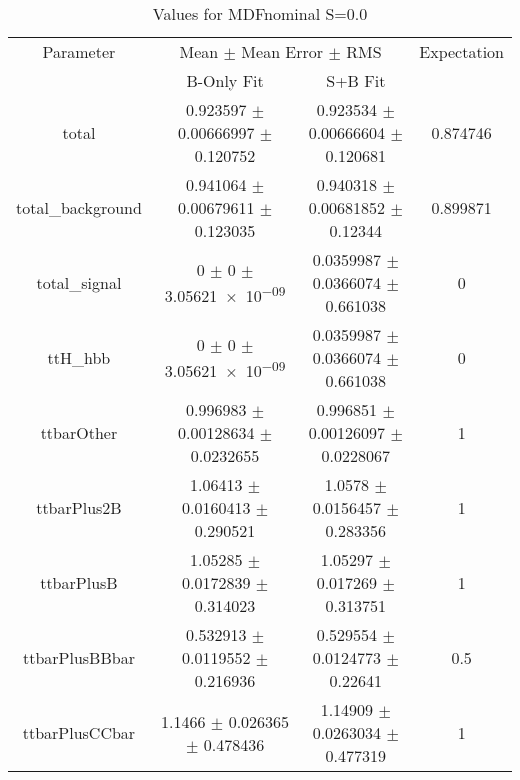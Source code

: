 \begin{table}
\centering
\caption{Values for MDFnominal S=0.0}
\begin{tabular}{cccc}
\toprule
Parameter & \multicolumn{2}{c}{Mean $\pm$ Mean Error $\pm$ RMS} & Expectation\\
 & B-Only Fit & S+B Fit & \\
\midrule
total & \num{0.923597} $\pm$ \num{0.00666997} $\pm$ \num{0.120752} & \num{0.923534} $\pm$ \num{0.00666604} $\pm$ \num{0.120681} & \num{0.874746}\\
total\_background & \num{0.941064} $\pm$ \num{0.00679611} $\pm$ \num{0.123035} & \num{0.940318} $\pm$ \num{0.00681852} $\pm$ \num{0.12344} & \num{0.899871}\\
total\_signal & \num{0} $\pm$ \num{0} $\pm$ \num{3.05621e-09} & \num{0.0359987} $\pm$ \num{0.0366074} $\pm$ \num{0.661038} & \num{0}\\
ttH\_hbb & \num{0} $\pm$ \num{0} $\pm$ \num{3.05621e-09} & \num{0.0359987} $\pm$ \num{0.0366074} $\pm$ \num{0.661038} & \num{0}\\
ttbarOther & \num{0.996983} $\pm$ \num{0.00128634} $\pm$ \num{0.0232655} & \num{0.996851} $\pm$ \num{0.00126097} $\pm$ \num{0.0228067} & \num{1}\\
ttbarPlus2B & \num{1.06413} $\pm$ \num{0.0160413} $\pm$ \num{0.290521} & \num{1.0578} $\pm$ \num{0.0156457} $\pm$ \num{0.283356} & \num{1}\\
ttbarPlusB & \num{1.05285} $\pm$ \num{0.0172839} $\pm$ \num{0.314023} & \num{1.05297} $\pm$ \num{0.017269} $\pm$ \num{0.313751} & \num{1}\\
ttbarPlusBBbar & \num{0.532913} $\pm$ \num{0.0119552} $\pm$ \num{0.216936} & \num{0.529554} $\pm$ \num{0.0124773} $\pm$ \num{0.22641} & \num{0.5}\\
ttbarPlusCCbar & \num{1.1466} $\pm$ \num{0.026365} $\pm$ \num{0.478436} & \num{1.14909} $\pm$ \num{0.0263034} $\pm$ \num{0.477319} & \num{1}\\
\bottomrule
\end{tabular}
\end{table}
